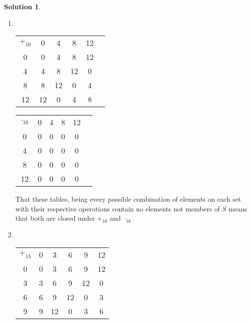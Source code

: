 \documentclass[10pt]{article}
\theoremstyle{definition}
\newtheorem{soln}{Solution}
\begin{document}
\begin{soln}~\\
  \begin{enumerate}[label=(\alph*)]
    \item ~\begin{center}
            \setlength\extrarowheight{3pt}
            \noindent\begin{tabular}{c | c c c c c}
              $+_{16}$ & 0  & 4  & 8  & 12 \\
              \cline{1-5}
              0        & 0  & 4  & 8  & 12 \\
              4        & 4  & 8  & 12 & 0  \\
              8        & 8  & 12 & 0  & 4  \\
              12       & 12 & 0  & 4  & 8  \\
            \end{tabular}
            \qquad
            \setlength\extrarowheight{3pt}
            \noindent\begin{tabular}{c | c c c c c}
              $\cdot_{16}$ & 0 & 4 & 8 & 12 \\
              \cline{1-5}
              0            & 0 & 0 & 0 & 0  \\
              4            & 0 & 0 & 0 & 0  \\
              8            & 0 & 0 & 0 & 0  \\
              12           & 0 & 0 & 0 & 0  \\
            \end{tabular}
          \end{center}
          That these tables, being every possible combination of elements on each set with their respective operations
          contain no elements not members of $S$ means that both are closed under $+_{16}$ and $\cdot_{16}$.
    \item ~\begin{center}
            \setlength\extrarowheight{3pt}
            \noindent\begin{tabular}{c | c c c c c}
              $+_{15}$ & 0  & 3  & 6  & 9  & 12 \\
              \cline{1-6}
              0        & 0  & 3  & 6  & 9  & 12 \\
              3        & 3  & 6  & 9  & 12 & 0  \\
              6        & 6  & 9  & 12 & 0  & 3  \\
              9        & 9  & 12 & 0  & 3  & 6  \\

\end{tabular}
\end{center}
\end{enumerate}
\end{soln}
\end{document}

